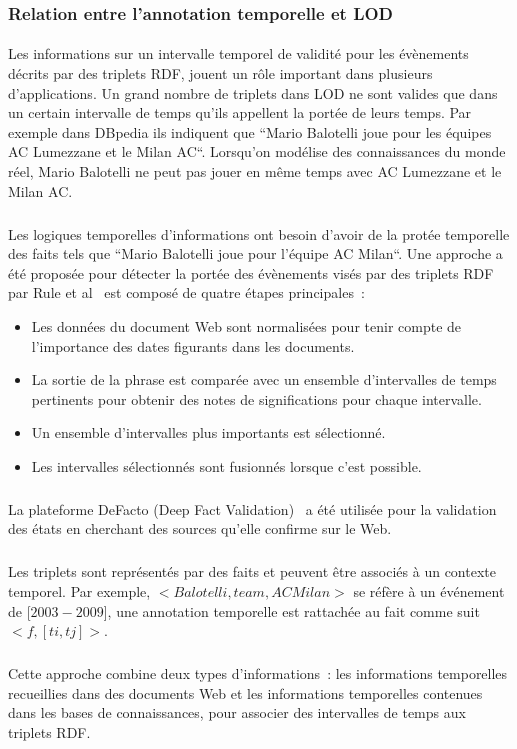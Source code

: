 \documentclass[12pt,a4]{report}
\begin{document}
\subsubsection{Relation entre l'annotation temporelle et LOD}
\paragraph{}
Les informations sur un intervalle temporel de validité pour les évènements décrits par des triplets RDF, jouent un rôle important dans plusieurs d'applications.
Un grand nombre de triplets dans LOD ne sont valides que dans un certain intervalle de temps qu'ils appellent la portée de leurs temps.
Par exemple dans DBpedia ils indiquent que ``Mario Balotelli joue pour les équipes AC Lumezzane et le Milan AC``. Lorsqu'on modélise des connaissances du monde réel, Mario Balotelli ne peut pas jouer en même temps avec AC Lumezzane et le Milan AC.
\subparagraph{}
Les logiques temporelles d'informations ont besoin d'avoir de la protée temporelle des faits tels que ``Mario Balotelli joue pour l'équipe AC Milan``.
Une approche a été proposée pour détecter la portée des évènements visés par des triplets RDF par Rule et al~\cite{rula2014} est composé de quatre étapes principales~:
\begin{itemize}
\item Les données du document Web sont normalisées pour tenir compte de l’importance des dates figurants dans les documents.
\item La sortie de la phrase est comparée avec un ensemble d’intervalles de temps pertinents pour obtenir des notes de significations pour chaque intervalle.
\item Un ensemble d’intervalles plus importants est sélectionné.
\item Les intervalles sélectionnés sont fusionnés lorsque c’est possible.
\end{itemize}
\subparagraph{}
La plateforme DeFacto (Deep Fact Validation)~\cite{lehmann2012} a été utilisée pour la validation des états en cherchant des sources qu'elle confirme sur le Web.
\subparagraph{}
Les triplets sont représentés par des faits et peuvent être associés à un contexte temporel.
Par exemple, $<Balotelli, team, AC Milan>$ se réfère à un événement de [$2003-2009$], une annotation temporelle est rattachée au fait comme suit $<f, [ti,tj]>$.
\subparagraph{}
Cette approche combine deux types d'informations~: les informations temporelles recueillies dans des documents Web et les informations temporelles contenues dans les bases de connaissances, pour associer des intervalles de temps aux triplets RDF.
\end{document}
